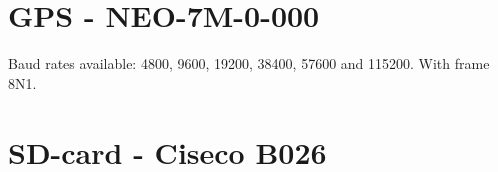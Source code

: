 \section{GPS - NEO-7M-0-000}
Baud rates available: \num{4800}, \num{9600}, \num{19200}, \num{38400}, \num{57600} and \num{115200}. With frame 8N1.

\cite{MKRSchem}

\section{SD-card - Ciseco B026}

\FloatBarrier
